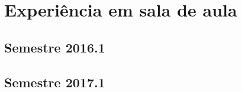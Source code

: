 \section{Experiência em sala de aula}
\label{sec-experiencia}



\subsection{Semestre 2016.1}
\label{sec-exp-2016}

\subsection{Semestre 2017.1}
\label{sec-exp-2017}
